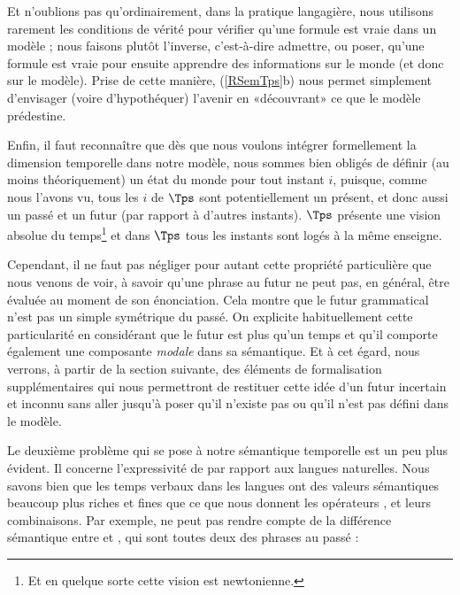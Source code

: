Et n'oublions pas qu'ordinairement, dans la pratique langagière, nous utilisons rarement les conditions de vérité pour vérifier qu'une formule est vraie dans un modèle ; nous faisons plutôt l'inverse, c'est-à-dire admettre, ou poser, qu'une formule est vraie pour ensuite apprendre des informations sur le monde (et donc sur le modèle).  Prise de cette manière, (\RSem\ref{RSemTps}b) nous permet simplement d'envisager (voire d'hypothéquer) l'avenir en «découvrant» ce que le modèle prédestine. 

Enfin, il faut reconnaître que dès que nous voulons intégrer formellement la dimension temporelle dans notre modèle, nous sommes bien obligés de définir (au moins théoriquement) un état du monde pour tout instant $i$, puisque, comme nous l'avons vu, tous les $i$ de $\Tps$ sont potentiellement un présent, et donc aussi un passé et un futur (par rapport à d'autres instants). $\Tps$ présente une vision absolue du temps\footnote{Et en quelque sorte cette vision est newtonienne.} et dans $\Tps$ tous les instants sont logés à la même enseigne.


Cependant, il ne faut pas négliger pour autant cette propriété particulière que nous venons de voir, à savoir qu'une phrase au futur ne peut pas, en général, être évaluée au moment de son énonciation. 
Cela montre que le futur grammatical n'est pas un simple symétrique du passé.
On explicite habituellement cette particularité en considérant que le futur est plus qu'un temps et qu'il comporte également une composante \emph{modale} dans sa sémantique.  Et à cet égard, nous verrons, à partir de la section suivante, des éléments de formalisation supplémentaires qui nous permettront de restituer cette idée d'un futur incertain et inconnu sans aller jusqu'à poser qu'il n'existe pas ou qu'il n'est pas défini dans le modèle.


\medskip\largerpage[-1]

Le deuxième problème qui se pose à notre sémantique temporelle est un peu plus évident. Il concerne l'expressivité de {\LO} par rapport aux langues naturelles.
Nous savons bien que les temps verbaux dans les langues ont des
valeurs sémantiques beaucoup plus riches et fines que ce que nous
donnent les opérateurs {\mP}, {\mF} et leurs  combinaisons.  
Par exemple, {\mP} ne peut pas rendre compte de la différence sémantique
entre \Next[a] et \Next[b], qui sont toutes deux des phrases au passé :

